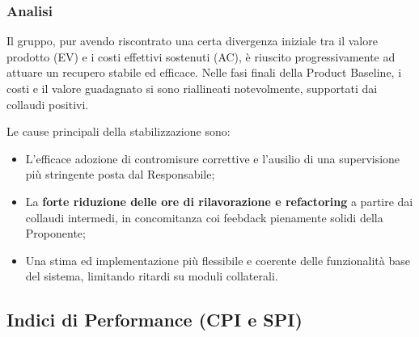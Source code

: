 \documentclass[a4paper,11pt,oneside]{scrartcl}
\begin{document}
\subsubsection*{Analisi}

Il gruppo, pur avendo riscontrato una certa divergenza iniziale tra il valore prodotto (EV) e i costi effettivi sostenuti (AC), è riuscito progressivamente ad attuare un recupero stabile ed efficace. Nelle fasi finali della Product Baseline, i costi e il valore guadagnato si sono riallineati notevolmente, supportati dai collaudi positivi.

Le cause principali della stabilizzazione sono:
\begin{itemize}
    \item L'efficace adozione di contromisure correttive e l'ausilio di una supervisione più stringente posta dal Responsabile;
    \item La \textbf{forte riduzione delle ore di rilavorazione e refactoring} a partire dai collaudi intermedi, in concomitanza coi feebdack pienamente solidi della Proponente;
    \item Una stima ed implementazione più flessibile e coerente delle funzionalità base del sistema, limitando ritardi su moduli collaterali.
\end{itemize}

\subsection{Indici di Performance (CPI e SPI)}
\end{document}
